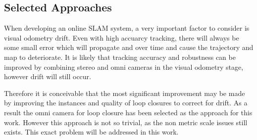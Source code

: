 \subsection{Selected Approaches}
\label{subsec:selected_approach}

When developing an online SLAM system, a very important factor to consider is visual odometry drift.  Even with high accuarcy tracking, there will always be some small error which will propagate and over time and cause the trajectory and map to deteriorate. It is likely that tracking accuracy and robustness can be improved by combining stereo and omni cameras in the visual odometry stage, however drift will still occur.

Therefore it is conceivable that the most significant improvement may be made by improving the instances and quality of loop closures to correct for drift.  As a result the omni camera for loop closure has been selected as the approach for this work.  However this approach is not so trivial, as the non metric scale issues still exists.  This exact problem will be addressed in this work.